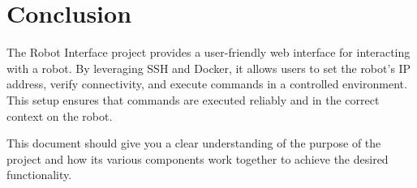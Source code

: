 \section{Conclusion}
The Robot Interface project provides a user-friendly web interface for interacting with a robot. By leveraging SSH and Docker, it allows users to set the robot's IP address, verify connectivity, and execute commands in a controlled environment. This setup ensures that commands are executed reliably and in the correct context on the robot.

This document should give you a clear understanding of the purpose of the project and how its various components work together to achieve the desired functionality.